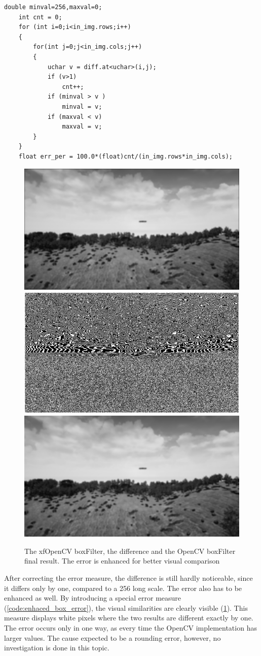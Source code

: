 \begin{lstlisting}
double minval=256,maxval=0;
	int cnt = 0;
	for (int i=0;i<in_img.rows;i++)
	{
		for(int j=0;j<in_img.cols;j++)
		{
			uchar v = diff.at<uchar>(i,j);
			if (v>1)
				cnt++;
			if (minval > v )
				minval = v;
			if (maxval < v)
				maxval = v;
		}
	}
	float err_per = 100.0*(float)cnt/(in_img.rows*in_img.cols);
\end{lstlisting}

\begin{figure}[b]
    \centering
    \includegraphics[width=.32\linewidth]{images/box_filter/HLS_img.jpg}
    \includegraphics[width=.32\linewidth]{images/box_filter/diff_img.jpg}
    \includegraphics[width=.32\linewidth]{images/box_filter/OCV_img.jpg}
    \caption{The xfOpenCV boxFilter, the difference and the OpenCV boxFilter final result. The error is enhanced for better visual comparison}
    \label{fig:box_error}
\end{figure}

After correcting the error measure, the difference is still hardly noticeable, since it differs only by one, compared to a 256 long scale.
The error also has to be enhanced as well.
By introducing a special error measure (\cref{code:enhaced_box_error}), the visual similarities are clearly visible (\cref{fig:box_error}).
This measure displays white pixels where the two results are different exactly by one.
The error occurs only in one way, as every time the OpenCV implementation has larger values.
The cause expected to be a rounding error, however, no investigation is done in this topic.

